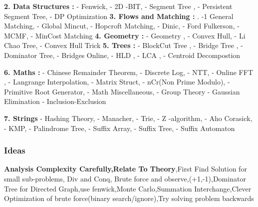 \documentclass[12pt]{extarticle}
\author{
	Ayush Ranjan, Naman Jain, Manish Tanwar
}
\begin{document}
\maketitle
		\begin{multicols*}{2}
			
			\setlength{\parskip}{0.0in}
			\setlength{\parskip}{0.0in}
			
			\textbf{2. Data Structures : }
			 -  Fenwick, - 2D -BIT,  - Segment Tree ,  - Persistent Segment Tree,  - DP Optimization
			\newline
			\textbf{3. Flows and Matching : }
			. -1  General Matching,  - Global Mincut,  - Hopcroft Matching,  - Dinic,  - Ford Fulkerson,  - MCMF,  - MinCost Matching
			\newline
			\textbf{4. Geometry : }
			 -  Geometry ,  - Convex Hull,  - Li Chao Tree,  - Convex Hull Trick
						\newline
			\textbf{5. Trees : }
			 -  BlockCut Tree ,  - Bridge Tree ,  - Dominator Tree,  - Bridges Online,  - HLD ,  - LCA ,  - Centroid Decompostion
			\newline
			
			\textbf{6. Maths : }
			 -  Chinese Remainder Theorem,  - Discrete Log,  - NTT,  - Online FFT ,  - Langrange Interpolation,  - Matrix Struct,  - nCr(Non Prime Modulo),  - Primitive Root Generator,  - Math Miscellaneous,  -  Group Theory  -  Gaussian Elimination  - Inclusion-Exclusion
			
			\textbf{7. Strings}
			 - Hashing Theory,  - Manacher,  - Trie,  - Z -algorithm,  - Aho Corasick,  - KMP,  - Palindrome Tree,  - Suffix Array,  - Suffix Tree,  - Suffix Automaton
			\newline
			
			\subsubsection*{Ideas} 
			\textbf{Analysis Complexity Carefully,\quad Relate To Theory},\quad First Find Solution for small sub-problems, \quad
			Div and Conq\quad, Brute force and observe,\quad (+1,-1),\quad Dominator Tree for Directed Graph,\quad use fenwick,\quad Monte Carlo,\quad Summation Interchange,\quad Clever Optimization of brute force(binary search/ignore),\quad Try solving problem backwards
			\newline
			

\end{multicols*}
\end{document}
